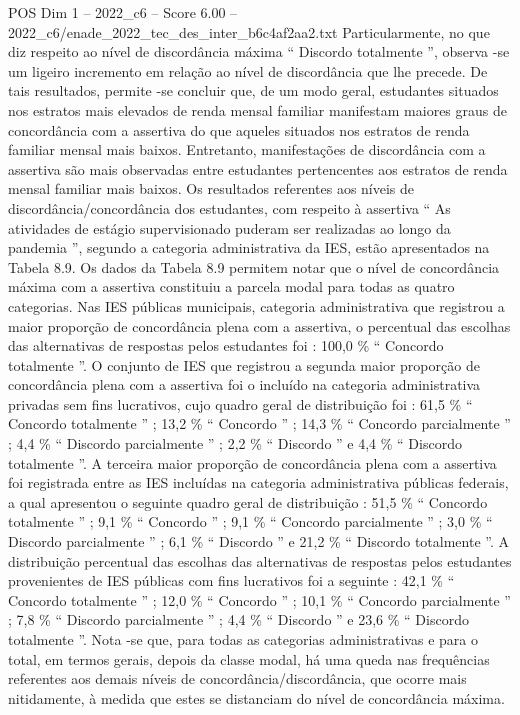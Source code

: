 \begin{textsample}{POS Dim 1 – 2022\_c6 – Score 6.00 – 2022\_c6/enade\_2022\_tec\_des\_inter\_b6c4af2aa2.txt}
Particularmente, no que diz respeito ao nível de discordância máxima “ Discordo totalmente ”, observa -se um ligeiro incremento em relação ao nível de discordância que lhe precede.
De tais resultados, permite -se concluir que, de um modo geral, estudantes situados nos estratos mais elevados de renda mensal familiar manifestam maiores graus de concordância com a assertiva do que aqueles situados nos estratos de renda familiar mensal mais baixos.
Entretanto, manifestações de discordância com a assertiva são mais observadas entre estudantes pertencentes aos estratos de renda mensal familiar mais baixos.
Os resultados referentes aos níveis de discordância/concordância dos estudantes, com respeito à assertiva “ As atividades de estágio supervisionado puderam ser realizadas ao longo da pandemia ”, segundo a categoria administrativa da IES, estão apresentados na Tabela 8.9.
Os dados da Tabela 8.9 permitem notar que o nível de concordância máxima com a assertiva constituiu a parcela modal para todas as quatro categorias.
Nas IES públicas municipais, categoria administrativa que registrou a maior proporção de concordância plena com a assertiva, o percentual das escolhas das alternativas de respostas pelos estudantes foi : 100,0 \% “ Concordo totalmente ”.
O conjunto de IES que registrou a segunda maior proporção de concordância plena com a assertiva foi o incluído na categoria administrativa privadas sem fins lucrativos, cujo quadro geral de distribuição foi : 61,5 \% “ Concordo totalmente ” ; 13,2 \% “ Concordo ” ; 14,3 \% “ Concordo parcialmente ” ; 4,4 \% “ Discordo parcialmente ” ; 2,2 \% “ Discordo ” e 4,4 \% “ Discordo totalmente ”.
A terceira maior proporção de concordância plena com a assertiva foi registrada entre as IES incluídas na categoria administrativa públicas federais, a qual apresentou o seguinte quadro geral de distribuição : 51,5 \% “ Concordo totalmente ” ; 9,1 \% “ Concordo ” ; 9,1 \% “ Concordo parcialmente ” ; 3,0 \% “ Discordo parcialmente ” ; 6,1 \% “ Discordo ” e 21,2 \% “ Discordo totalmente ”.
A distribuição percentual das escolhas das alternativas de respostas pelos estudantes provenientes de IES públicas com fins lucrativos foi a seguinte : 42,1 \% “ Concordo totalmente ” ; 12,0 \% “ Concordo ” ; 10,1 \% “ Concordo parcialmente ” ; 7,8 \% “ Discordo parcialmente ” ; 4,4 \% “ Discordo ” e 23,6 \% “ Discordo totalmente ”.
Nota -se que, para todas as categorias administrativas e para o total, em termos gerais, depois da classe modal, há uma queda nas frequências referentes aos demais níveis de concordância/discordância, que ocorre mais nitidamente, à medida que estes se distanciam do nível de concordância máxima.

\end{textsample}
